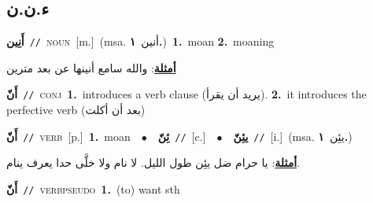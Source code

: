 \documentclass[10pt,a4paper,twoside]{article} %
\begin{document}
\begin{multicols}{2}
\vspace{-3mm}
\subsection*{\color{blue}\foreignlanguage{arabic}{ء.ن.ن}\color{blue}{}} 

{\setlength\topsep{0pt}\textbf{\foreignlanguage{arabic}{أَنِين}}\ {\color{gray}\texttt{//}\color{black}}\ \textsc{noun}\ [m.]\ \color{gray}(msa. \foreignlanguage{arabic}{أنين}~\foreignlanguage{arabic}{\textbf{١.}})\color{black}\ \textbf{1.}~moan  \textbf{2.}~moaning\  \begin{flushright}\color{gray}\foreignlanguage{arabic}{\textbf{\underline{\foreignlanguage{arabic}{أمثلة}}}: والله سامع أنينها عن بعد مترين}\end{flushright}\color{black}} \vspace{2mm}

{\setlength\topsep{0pt}\textbf{\foreignlanguage{arabic}{أَنّ}}\ {\color{gray}\texttt{//}\color{black}}\ \textsc{conj}\ \textbf{1.}~introduces a verb clause (يريد أن يقرأ).  \textbf{2.}~it introduces the perfective verb (بعد أن أكلت)\ } \vspace{2mm}

{\setlength\topsep{0pt}\textbf{\foreignlanguage{arabic}{أَنّ}}\ {\color{gray}\texttt{//}\color{black}}\ \textsc{verb}\ [p.]\ \textbf{1.}~moan\ \ $\bullet$\ \ \setlength\topsep{0pt}\textbf{\foreignlanguage{arabic}{ئِنّ}}\ {\color{gray}\texttt{//}\color{black}}\ [c.]\ \ $\bullet$\ \ \setlength\topsep{0pt}\textbf{\foreignlanguage{arabic}{يئِنّ}}\ {\color{gray}\texttt{//}\color{black}}\ [i.]\ \color{gray}(msa. \foreignlanguage{arabic}{يئِن}~\foreignlanguage{arabic}{\textbf{١.}})\color{black}\  \begin{flushright}\color{gray}\foreignlanguage{arabic}{\textbf{\underline{\foreignlanguage{arabic}{أمثلة}}}: يا حرام ضل يئِن طول الليل. لا نام ولا خلَّى حدا يعرف ينام.}\end{flushright}\color{black}} \vspace{2mm}

{\setlength\topsep{0pt}\textbf{\foreignlanguage{arabic}{أَنّ}}\ {\color{gray}\texttt{//}\color{black}}\ \textsc{verb\textunderscore pseudo}\ \textbf{1.}~(to) want sth\ } \vspace{2mm}


\end{multicols}
\end{document}
